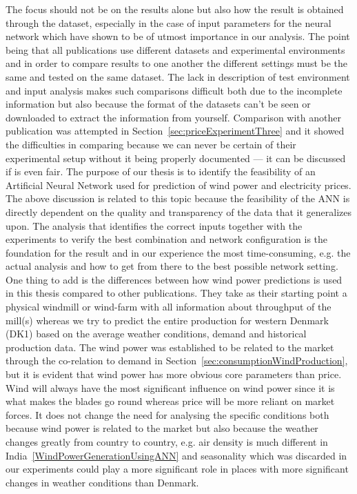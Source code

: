The focus should not be on the results alone but also how the result is obtained through the dataset, especially in the case of input parameters for the neural network which have shown to be of utmost importance in our analysis. The point being that all publications use different datasets and experimental environments and in order to compare results to one another the different settings must be the same and tested on the same dataset. The lack in description of test environment and input analysis makes such comparisons difficult both due to the incomplete information but also because the format of the datasets can't be seen or downloaded to extract the information from yourself. Comparison with another publication was attempted in Section~\ref{sec:priceExperimentThree} and it showed the difficulties in comparing because we can never be certain of their experimental setup without it being properly documented --- it can be discussed if is even fair. The purpose of our thesis is to identify the feasibility of an Artificial Neural Network used for prediction of wind power and electricity prices. The above discussion is related to this topic because the feasibility of the ANN is directly dependent on the quality and transparency of the data that it generalizes upon. The analysis that identifies the correct inputs together with the experiments to verify the best combination and network configuration is the foundation for the result and in our experience the most time-consuming, e.g. the actual analysis and how to get from there to the best possible network setting. One thing to add is the differences between how wind power predictions is used in this thesis compared to other publications. They take as their starting point a physical windmill or wind-farm with all information about throughput of the mill(s)\cite{windForecastPortugal,ShortTermWindPowerForecasting,dayAheadImpactOfWindPowerForecasts,WindPowerGenerationUsingANN} whereas we try to predict the entire production for western Denmark (DK1) based on the average weather conditions, demand and historical production data. The wind power was established to be related to the market through the co-relation to demand in Section~\ref{sec:consumptionWindProduction}, but it is evident that wind power has more obvious core parameters than price. Wind will always have the most significant influence on wind power since it is what makes the blades go round whereas price will be more reliant on market forces. It does not change the need for analysing the specific conditions both because wind power is related to the market but also because the weather changes greatly from country to country, e.g. air density is much different in India~\ref{WindPowerGenerationUsingANN} and seasonality which was discarded in our experiments could play a more significant role in places with more significant changes in weather conditions than Denmark.

